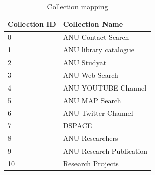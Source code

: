 \begin{table}[h]
\centering
\caption{Collection mapping}
\label{table:collection_mapping}
\begin{tabular}{@{}ll@{}}
\toprule
Collection ID                                              & Collection Name          \\ \midrule
0 														  & ANU Contact Search       \\
1                                                          & ANU library catalogue    \\ 
2                                                          & ANU Studyat              \\ 
3                                                          & ANU Web Search           \\ 
4                                                          & ANU YOUTUBE Channel      \\ 
5                                                          & ANU MAP Search           \\ 
6                                                          & ANU Twitter Channel      \\ 
7                                                          & DSPACE                   \\ 
8                                                          & ANU Researchers          \\ 
9                                                          & ANU Research Publication \\ 
10                                                         & Research Projects        \\ \bottomrule
\end{tabular}
\end{table}

